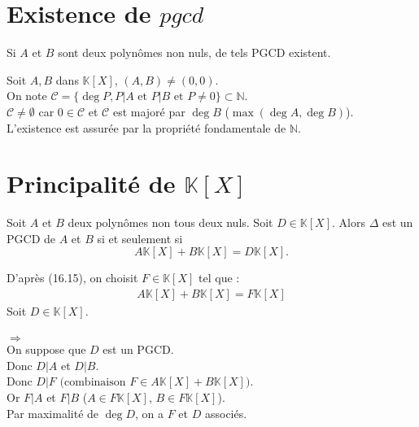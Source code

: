 \documentclass[../main.tex]{subfiles}
\begin{document}
\setcounter{section}{16}
\section{Existence de $pgcd$}
\begin{tcolorbox}[title=Propostion 16.17, title filled=false, colframe=lightblue, colback=lightblue!10!white]
    Si $A$ et $B$ sont deux polynômes non nuls, de tels PGCD existent. 
\end{tcolorbox}

\noindent Soit $A, B$ dans $\mathbb{K}[X]$, $(A, B) \neq (0, 0)$.  \\
On note $\mathcal{C} = \{ \deg P, P|A \text{ et } P|B \text{ et } P\neq 0 \} \subset \mathbb{N}$. \\
$\mathcal{C} \neq \emptyset$ car $0 \in \mathcal{C}$ et $\mathcal{C}$ est majoré par $\deg B$ ($\max (\deg A, \deg B)$). \\
L'existence est assurée par la propriété fondamentale de $\mathbb{N}$. 

\section{Principalité de $\mathbb{K}[X]$}
\begin{tcolorbox}[title=Propostion 16.18, title filled=false, colframe=lightblue, colback=lightblue!10!white]
    Soit $A$ et $B$ deux polynômes non tous deux nuls. Soit $D \in \mathbb{K}[X]$. Alors $\Delta$ est un PGCD de $A$ et $B$ si et seulement si 
    $$A \mathbb{K}[X] + B \mathbb{K}[X] = D \mathbb{K}[X].$$
\end{tcolorbox}

\noindent D'après (16.15), on choisit $F \in \mathbb{K}[X]$ tel que :
\begin{align*}
    A \mathbb{K}[X] + B \mathbb{K}[X] = F \mathbb{K}[X]
\end{align*}
Soit $D \in \mathbb{K}[X]$. \\ \\

$\boxed{\Rightarrow}$ \\
On suppose que $D$ est un PGCD. \\
Donc $D|A$ et $D|B$. \\
Donc $D|F \text{ (combinaison $F \in A \mathbb{K}[X] + B \mathbb{K}[X]$)}$. \\
Or $F|A$ et $F|B$ ($A \in F \mathbb{K}[X]$, $B \in F \mathbb{K}[X]$). \\
Par maximalité de $\deg D$, on a $F$ et $D$ associés. \\ \\
\end{document}
